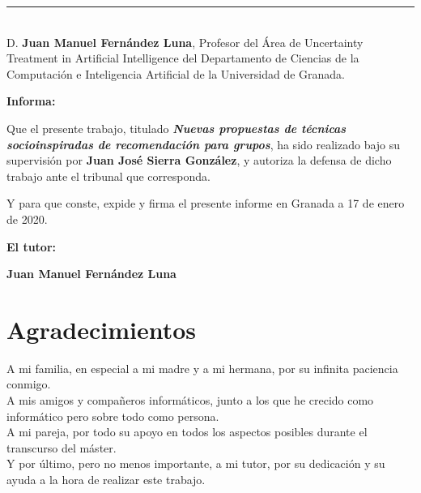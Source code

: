 \noindent\rule[-1ex]{\textwidth}{2pt}\\[4.5ex]

D. \textbf{Juan Manuel Fernández Luna}, Profesor del Área de Uncertainty Treatment in Artificial Intelligence del Departamento de Ciencias de la Computación e Inteligencia Artificial de la Universidad de Granada.

\vspace{0.5cm}

\textbf{Informa:}

\vspace{0.5cm}

Que el presente trabajo, titulado \textit{\textbf{Nuevas propuestas de técnicas socioinspiradas de recomendación para grupos}},
ha sido realizado bajo su supervisión por \textbf{Juan José Sierra González}, y autoriza la defensa de dicho trabajo ante el tribunal
que corresponda.

\vspace{0.5cm}

Y para que conste, expide y firma el presente informe en Granada a 17 de enero de 2020.

\vspace{1cm}

\textbf{El tutor:}

\vspace{5cm}

\noindent \textbf{Juan Manuel Fernández Luna}

\chapter*{Agradecimientos}
\thispagestyle{empty}

\vspace{1cm}

A mi familia, en especial a mi madre y a mi hermana, por su infinita paciencia conmigo.\\

A mis amigos y compañeros informáticos, junto a los que he crecido como informático pero sobre todo como persona.\\

A mi pareja, por todo su apoyo en todos los aspectos posibles durante el transcurso del máster.\\

Y por último, pero no menos importante, a mi tutor, por su dedicación y su ayuda a la hora de realizar este trabajo.\\